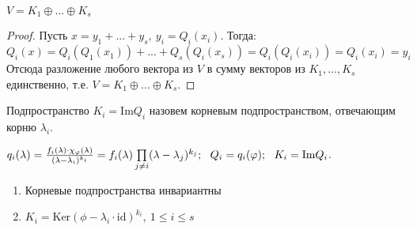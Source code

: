     \begin{subtheorem}
        $V = K_1 \oplus ... \oplus K_s$
    \end{subtheorem}
    \begin{proof}
        Пусть $x = y_1 + ... + y_s, \ y_i = Q_i(x_i)$. Тогда:
        $$Q_i(x) = Q_i(Q_1(x_1)) + ... + Q_s(Q_i(x_s)) = Q_i(Q_i(x_i)) = Q_i(x_i) = y_i$$
        Отсюда разложение любого вектора из $V$ в сумму векторов из $K_1,...,K_s$ единственно, т.е. $V = K_1 \oplus ... \oplus K_s$.
    \end{proof}
    \begin{definition}
        Подпространство $K_i = \text{Im} Q_i$ назовем корневым подпространством, отвечающим корню $\lambda_i$.
    \end{definition}
    \begin{remark}
        $q_i(\lambda) = \frac{f_i(\lambda)\cdot \chi_\phi(\lambda)}{(\lambda-\lambda_i)^{k_i}} = f_i(\lambda)\prod\limits_{j \neq i}(\lambda-\lambda_j)^{k_j}; \ \ Q_i = q_i(\phi); \ \ K_i = \textup{Im}Q_i$.
    \end{remark} 
    \begin{subtheorem}\tab
        \begin{enumerate}
            \item Корневые подпространства инвариантны
            \item $K_i = \text{Ker} (\phi - \lambda_i\cdot \text{id})^{k_i}, \ 1\leq i \leq s$ 
        \end{enumerate}
    \end{subtheorem}
